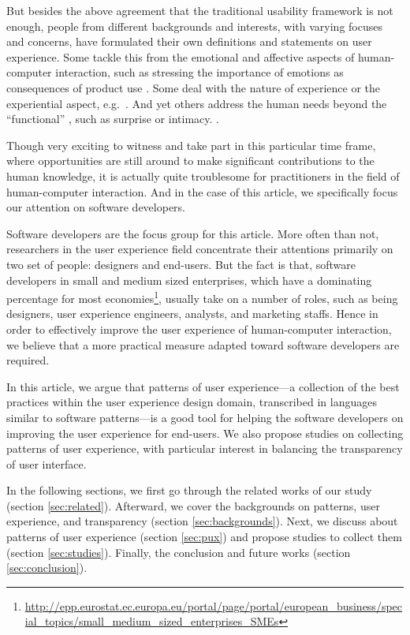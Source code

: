 \documentclass[a4paper,titlepage]{article}
\begin{document}
But besides the above agreement that the traditional usability
framework is not enough, people from different backgrounds and
interests, with varying focuses and concerns, have formulated their
own definitions and statements on user experience. Some tackle this
from the emotional and affective aspects of human-computer
interaction, such as stressing the importance of emotions as
consequences of product use \citep{emotions:desmet}. Some deal with
the nature of experience or the experiential aspect,
e.g.\ \citet{experience:forlizzi}. And yet others address the human
needs beyond the ``functional'' \citep{emotional:norman}, such as
surprise or intimacy. \citep{alternatives:gaver}.

Though very exciting to witness and take part in this particular time
frame, where opportunities are still around to make significant
contributions to the human knowledge, it is actually quite troublesome
for practitioners in the field of human-computer interaction. And in
the case of this article, we specifically focus our attention on
software developers.

Software developers are the focus group for this article. More often
than not, researchers in the user experience field concentrate their
attentions primarily on two set of people: designers and
end-users. But the fact is that, software developers in small and
medium sized enterprises, which have a dominating percentage for most
economies\footnote{\url{http://epp.eurostat.ec.europa.eu/portal/page/portal/european_business/special_topics/small_medium_sized_enterprises_SMEs}},
usually take on a number of roles, such as being designers, user
experience engineers, analysts, and marketing staffs. Hence in order
to effectively improve the user experience of human-computer
interaction, we believe that a more practical measure adapted toward
software developers are required.

In this article, we argue that patterns of user experience---a
collection of the best practices within the user experience design
domain, transcribed in languages similar to software patterns---is a
good tool for helping the software developers on improving the user
experience for end-users. We also propose studies on collecting
patterns of user experience, with particular interest in balancing the
transparency of user interface.

In the following sections, we first go through the related works of
our study (section \ref{sec:related}). Afterward, we cover the
backgrounds on patterns, user experience, and transparency (section
\ref{sec:backgrounds}). Next, we discuss about patterns of user
experience (section \ref{sec:pux}) and propose studies to collect
them (section \ref{sec:studies}). Finally, the conclusion and
future works (section \ref{sec:conclusion}).
\end{document}
